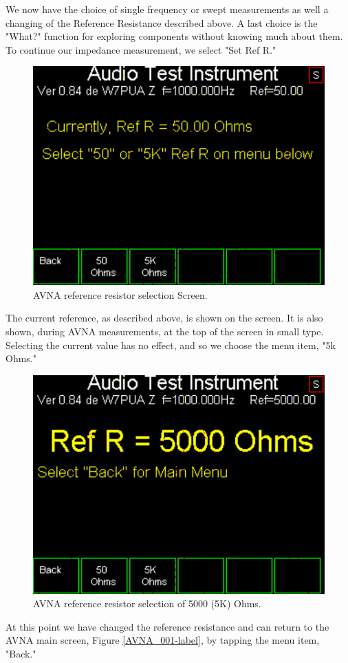 %
We now have the choice  of single frequency or swept measurements as well a changing of the Reference Resistance described above. A last choice is the "What?" function for exploring components without knowing much about them. To continue our impedance measurement, we select "Set Ref R."
\begin{figure}[H]
\begin{center}
\includegraphics[scale=0.75]{./images/AVNA_003.pdf}
\caption{AVNA reference resistor selection  Screen.}
\label{AVNA_003-label}
\end{center}
\end{figure}
%
The current reference, as described above, is shown on the screen. It is also shown, during AVNA measurements, at the top of the screen in small type. Selecting the current value has no effect, and so we choose the menu item, "5k Ohms."
\begin{figure}[H]
\begin{center}
\includegraphics[scale=0.75]{./images/AVNA_004.pdf}
\caption{AVNA reference resistor selection of 5000 (5K) Ohms.}
\label{AVNA_004-label}
\end{center}
\end{figure}
At this point we have changed the reference resistance and can return to the AVNA main screen, Figure \ref{AVNA_001-label}, by tapping the menu item, "Back."

